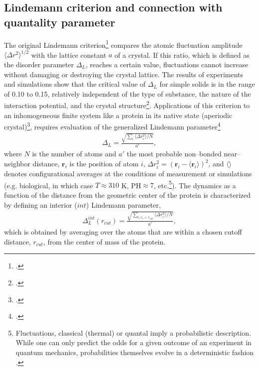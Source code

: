  \begin{subappendices}
\section[Lindemann criterion and  quantality parameter]{Lindemann criterion and connection with quantality parameter}\label{C2AppC}
The original Lindemann criterion\footnote{\cite{Lindemann:10}.} compares the atomic fluctuation amplitude $\langle\Delta r^2\rangle^{1/2}$ with the lattice constant $a$ of a crystal. If this ratio, which is defined as the disorder parameter $\Delta_L$, reaches a certain value, fluctuations cannot increase without damaging or destroying the crystal lattice. The results of experiments and simulations show that the critical value of $\Delta_L$ for simple solids is in the range of 0.10 to 0.15, relatively independent of the type of substance, the nature of the interaction potential, and the crystal structure\footnote{\cite{Bilgram:87,Lowen:94,Stillinger:95}.}. Applications of this criterion to an inhomogeneous finite system like a protein in its native state (aperiodic crystal)\footnote{\cite{Schrodinger:44}.}, requires evaluation of the generalized Lindemann parameter\footnote{\cite{Stillinger:90}.}
\begin{align}
\Delta_L=\frac{\sqrt{\sum_i\langle \Delta r_i^2\rangle/N}}{a'},
\end{align}  
where $N$ is the number of atoms and $a'$ the most probable non--bonded near--neighbor distance, $\mathbf r_i$ is the position of atom $i$, $\Delta r_i^2=(\mathbf r_i-\langle \mathbf r_i\rangle)^2$, and $\langle\rangle$ denotes configurational averages at the conditions of measurement or simulations (e.g. biological, in which case $T\approx 310$ K, PH$\approx 7$, etc.\footnote{Fluctuations, classical (thermal) or quantal imply a probabilistic description. While one can only predict the odds for a given outcome of an experiment in quantum mechanics, probabilities themselves evolve in a deterministic fashion \cite{Born:48}.}). The dynamics as a function of the distance from the geometric center of the protein is characterized by defining an interior ($int$) Lindemann parameter, 
\begin{align}
\Delta^{int}_L(r_{cut})=\frac{\sqrt{\sum_{i,r_i<r_{cut}}\langle \Delta r_i^2\rangle/N}}{a'},
\end{align}  
which is obtained by averaging over the atoms that are within a chosen cutoff distance, $r_{cut}$, from the center of mass of the protein.


\end{subappendices}
